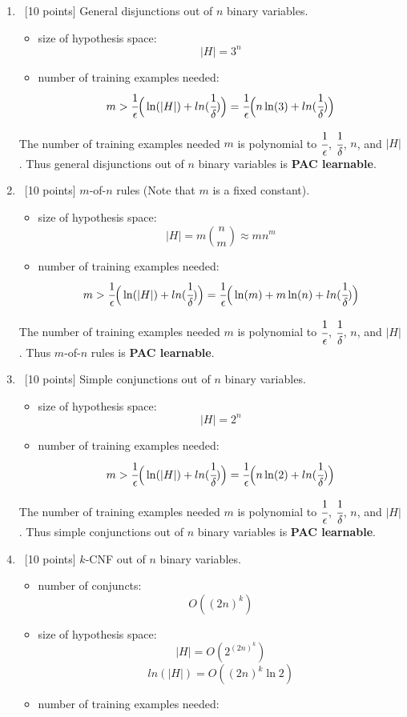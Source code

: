 \documentclass[12pt, fullpage,letterpaper]{article}
\begin{document}
\begin{enumerate}
\item~[10 points] General disjunctions out of $n$ binary variables.  
\begin{itemize}
\item size of hypothesis space: 
$$|H|=3^n$$
\item number of training examples needed: 
$$m>\cfrac{1}{\epsilon}\Big(\ln(|H|)+ln(\cfrac{1}{\delta})\Big)=\cfrac{1}{\epsilon}\Big(n\ln(3)+ln(\cfrac{1}{\delta})\Big)$$
\end{itemize}
The number of training examples needed $m$ is polynomial to $\cfrac{1}{\epsilon}$, $\cfrac{1}{\delta}$, $n$, and $|H|$. Thus general disjunctions out of $n$ binary variables is \textbf{PAC learnable}.
\item~[10 points] $m$-of-$n$ rules (Note that $m$ is a fixed constant). 
\begin{itemize}
\item size of hypothesis space: $$|H|=m{n \choose m} \approx mn^m$$
\item number of training examples needed: 
$$m>\cfrac{1}{\epsilon}\Big(\ln(|H|)+ln(\cfrac{1}{\delta})\Big)=\cfrac{1}{\epsilon}\Big(\ln(m)+m\ln(n)+ln(\cfrac{1}{\delta})\Big)$$
\end{itemize}
The number of training examples needed $m$ is polynomial to $\cfrac{1}{\epsilon}$, $\cfrac{1}{\delta}$, $n$, and $|H|$. Thus $m$-of-$n$ rules is \textbf{PAC learnable}.
\item~[10 points] Simple conjunctions out of $n$ binary variables. 
\begin{itemize}
\item size of hypothesis space: 
$$|H|=2^n$$
\item number of training examples needed: 
$$m>\cfrac{1}{\epsilon}\Big(\ln(|H|)+ln(\cfrac{1}{\delta})\Big)=\cfrac{1}{\epsilon}\Big(n\ln(2)+ln(\cfrac{1}{\delta})\Big)$$
\end{itemize}
The number of training examples needed $m$ is polynomial to $\cfrac{1}{\epsilon}$, $\cfrac{1}{\delta}$, $n$, and $|H|$. Thus simple conjunctions out of $n$ binary variables is \textbf{PAC learnable}.
\item~[10 points] $k$-CNF out of $n$ binary variables. 
\begin{itemize}
\item number of conjuncts:
$$O((2n)^k)$$
\item size of hypothesis space: 
$$|H|=O(2^{(2n)^k})$$
$$ln(|H|)=O((2n)^k\ln2)$$
\item number of training examples needed: 

\end{itemize}
\end{enumerate}
\end{document}
